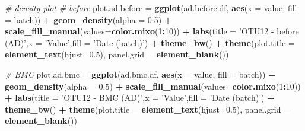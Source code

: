 \documentclass[]{book}
\newenvironment{Shaded}{\begin{snugshade}}{\end{snugshade}}
\newcommand{\KeywordTok}[1]{\textcolor[rgb]{0.13,0.29,0.53}{\textbf{#1}}}
\newcommand{\DataTypeTok}[1]{\textcolor[rgb]{0.13,0.29,0.53}{#1}}
\newcommand{\DecValTok}[1]{\textcolor[rgb]{0.00,0.00,0.81}{#1}}
\newcommand{\FloatTok}[1]{\textcolor[rgb]{0.00,0.00,0.81}{#1}}
\newcommand{\StringTok}[1]{\textcolor[rgb]{0.31,0.60,0.02}{#1}}
\newcommand{\CommentTok}[1]{\textcolor[rgb]{0.56,0.35,0.01}{\textit{#1}}}
\newcommand{\OperatorTok}[1]{\textcolor[rgb]{0.81,0.36,0.00}{\textbf{#1}}}
\newcommand{\NormalTok}[1]{#1}
\begin{document}
\begin{Shaded}
\begin{Highlighting}[]
\CommentTok{# density plot}
\CommentTok{# before}
\NormalTok{plot.ad.before =}\StringTok{ }\KeywordTok{ggplot}\NormalTok{(ad.before.df, }\KeywordTok{aes}\NormalTok{(}\DataTypeTok{x =}\NormalTok{ value, }\DataTypeTok{fill =}\NormalTok{ batch)) }\OperatorTok{+}\StringTok{ }\KeywordTok{geom_density}\NormalTok{(}\DataTypeTok{alpha =} \FloatTok{0.5}\NormalTok{) }\OperatorTok{+}\StringTok{ }\KeywordTok{scale_fill_manual}\NormalTok{(}\DataTypeTok{values=}\KeywordTok{color.mixo}\NormalTok{(}\DecValTok{1}\OperatorTok{:}\DecValTok{10}\NormalTok{)) }\OperatorTok{+}\StringTok{ }\KeywordTok{labs}\NormalTok{(}\DataTypeTok{title =} \StringTok{'OTU12 - before (AD)'}\NormalTok{,}\DataTypeTok{x =} \StringTok{'Value'}\NormalTok{,}\DataTypeTok{fill =} \StringTok{'Date (batch)'}\NormalTok{) }\OperatorTok{+}\StringTok{ }\KeywordTok{theme_bw}\NormalTok{() }\OperatorTok{+}\StringTok{ }\KeywordTok{theme}\NormalTok{(}\DataTypeTok{plot.title =} \KeywordTok{element_text}\NormalTok{(}\DataTypeTok{hjust=}\FloatTok{0.5}\NormalTok{), }\DataTypeTok{panel.grid =} \KeywordTok{element_blank}\NormalTok{())}

\CommentTok{# BMC}
\NormalTok{plot.ad.bmc =}\StringTok{ }\KeywordTok{ggplot}\NormalTok{(ad.bmc.df, }\KeywordTok{aes}\NormalTok{(}\DataTypeTok{x =}\NormalTok{ value, }\DataTypeTok{fill =}\NormalTok{ batch)) }\OperatorTok{+}\StringTok{ }\KeywordTok{geom_density}\NormalTok{(}\DataTypeTok{alpha =} \FloatTok{0.5}\NormalTok{) }\OperatorTok{+}\StringTok{ }\KeywordTok{scale_fill_manual}\NormalTok{(}\DataTypeTok{values=}\KeywordTok{color.mixo}\NormalTok{(}\DecValTok{1}\OperatorTok{:}\DecValTok{10}\NormalTok{)) }\OperatorTok{+}\StringTok{ }\KeywordTok{labs}\NormalTok{(}\DataTypeTok{title =} \StringTok{'OTU12 - BMC (AD)'}\NormalTok{,}\DataTypeTok{x =} \StringTok{'Value'}\NormalTok{,}\DataTypeTok{fill =} \StringTok{'Date (batch)'}\NormalTok{) }\OperatorTok{+}\StringTok{ }\KeywordTok{theme_bw}\NormalTok{() }\OperatorTok{+}\StringTok{ }\KeywordTok{theme}\NormalTok{(}\DataTypeTok{plot.title =} \KeywordTok{element_text}\NormalTok{(}\DataTypeTok{hjust=}\FloatTok{0.5}\NormalTok{), }\DataTypeTok{panel.grid =} \KeywordTok{element_blank}\NormalTok{())}



\end{Highlighting}
\end{Shaded}
\end{document}
